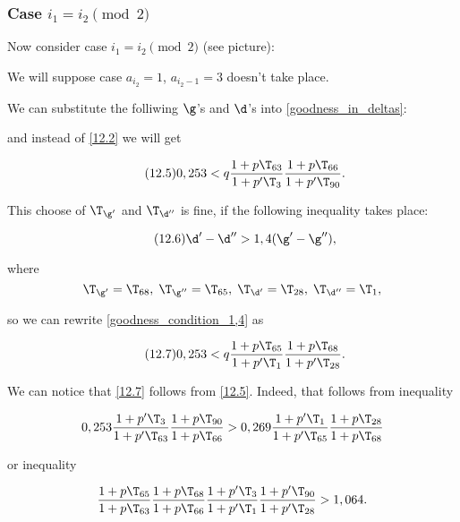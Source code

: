 \subsubsection{Case $i_1 = i_2 \pmod 2$}

Now consider case $i_1 = i_2 \pmod 2$ (see picture):


We will suppose case $a_{i_2} = 1$, $a_{i_2 - 1} = 3$ doesn't take place.

We can substitute the folliwing $\g$'s and $\d$'s
into \ref{goodness_in_deltas}:


and instead of \ref{12.2} we will get

\begin{equation}\tag{12.5}\label{12.5}
	0,253 < q
	\dfrac{1 + p \T_{63}}{1 + p' \T_{3}}
	\dfrac{1 + p \T_{66}}{1 + p' \T_{90}}.
\end{equation}

This choose of $\T_{\g'}$ and $\T_{\d''}$ is fine,
if the following inequality takes place:

\begin{equation}\tag{12.6}\label{goodness_condition_1,4}
	\d' - \d'' > 1,4 (\g' - \g''),
\end{equation}

where 
\begin{equation*}
	\T_{\g'} = \T_{68},\;
	\T_{\g''} = \T_{65},\;
	\T_{\d'} = \T_{28},\;
	\T_{\d''} = \T_{1},
\end{equation*}

so we can rewrite \ref{goodness_condition_1,4} as

\begin{equation}\tag{12.7}\label{12.7}
	0,253 < q
	\dfrac{1 + p \T_{65}}{1 + p' \T_{1}}
	\dfrac{1 + p \T_{68}}{1 + p' \T_{28}}.
\end{equation}

We can notice that \ref{12.7} follows from \ref{12.5}. Indeed, that follows from inequality

\begin{equation*}
	0,253
	\dfrac{1 + p' \T_{3}}{1 + p' \T_{63}}
	\dfrac{1 + p \T_{90}}{1 + p \T_{66}}
	>
	0,269
	\dfrac{1 + p' \T_{1}}{1 + p' \T_{65}}
	\dfrac{1 + p \T_{28}}{1 + p \T_{68}}
\end{equation*}

or inequality

\begin{equation*}
	\dfrac{1 + p \T_{65}}{1 + p \T_{63}}
	\dfrac{1 + p \T_{68}}{1 + p \T_{66}}
	\dfrac{1 + p' \T_{3}}{1 + p' \T_{1}}
	\dfrac{1 + p' \T_{90}}{1 + p' \T_{28}}
	>
	1,064.
\end{equation*}


